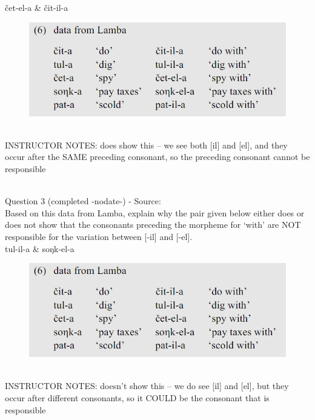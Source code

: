 \documentclass[12pt]{article}
\begin{document}
čet-el-a \& čit-il-a

\begin{figure}[H]
\includegraphics{../images/peng119_lamba.png}
\end{figure}

~\\
INSTRUCTOR NOTES: does show this -- we see both [il] and [el], and they occur after the SAME preceding consonant, so the preceding consonant cannot be responsible


~\\

{\large Question 3} (completed -nodate-) - Source: \\

Based on this data from Lamba, explain why the pair given below either does or does not show that the consonants preceding the morpheme for `with' are NOT responsible for the variation between [-il] and [-el].\\

tul-il-a \& soŋk-el-a

\begin{figure}[H]
\includegraphics{../images/peng119_lamba.png}
\end{figure}

~\\
INSTRUCTOR NOTES: doesn't show this -- we do see [il] and [el], but they occur after different consonants, so it COULD be the consonant that is responsible


~\\
\end{document}
